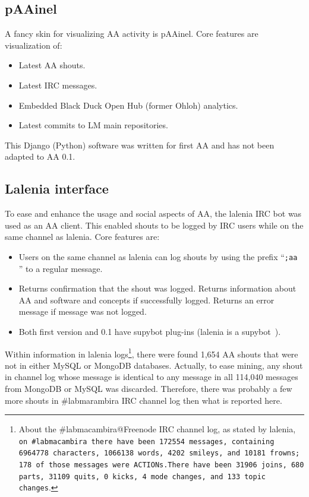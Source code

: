\documentclass[12pt,fleqn]{article}
\begin{document}
\subsection{pAAinel}\label{sec:aaPaainel}
A fancy skin for visualizing AA activity is pAAinel.
Core features are visualization of:
\begin{itemize}
    \item Latest AA shouts.
    \item Latest IRC messages.
    \item Embedded Black Duck Open Hub (former Ohloh) analytics.
    \item Latest commits to LM main repositories.
\end{itemize}

\noindent This Django (Python) software was written for first AA and has not been adapted to AA 0.1.

\subsection{Lalenia interface}\label{sec:lalenia}
To ease and enhance the usage and social aspects of AA, the lalenia IRC bot was used as an AA client.
This enabled shouts to be logged by IRC users while on the same channel as lalenia.
Core features are:
\begin{itemize}
    \item Users on the same channel as lalenia can log shouts by using the prefix ``\texttt{;aa }'' to a regular message.
    \item Returns confirmation that the shout was logged.
	    Returns information about AA and software and concepts if successfully logged.
		Returns an error message if message was not logged.
    \item Both first version and 0.1 have supybot plug-ins (lalenia is a supybot~\citep{supybot}).
\end{itemize}



Within information in lalenia logs\footnote{About
the \#labmacambira@Freenode IRC channel log,
as stated by lalenia, {\tt on \#labmacambira there have been 172554 messages, containing 6964778 characters, 1066138 words, 4202 smileys, and 10181 frowns; 178 of those messages were ACTIONs.There have been 31906 joins, 680 parts, 31109 quits, 0 kicks, 4 mode changes, and 133 topic\\ changes}.},
there were found 1,654 AA shouts that were not in either MySQL or MongoDB databases.
Actually, to ease mining, any shout in channel log whose message is identical to any message in all 114,040 messages from 
MongoDB or MySQL was discarded.
Therefore, there was probably a few more shouts in \#labmarambira IRC channel log then what is reported here.
\end{document}
